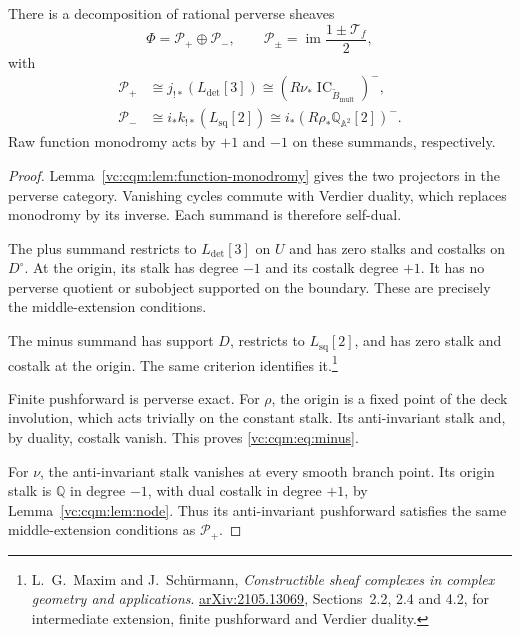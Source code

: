 \begin{theorem}\label{vc:cqm:thm:coefficient}
There is a decomposition of rational perverse sheaves
\begin{equation}\label{vc:cqm:eq:decomposition}
 \Phi=\mathcal P_+\oplus\mathcal P_-,
 \qquad \mathcal P_\pm=\operatorname{im}
                  \frac{1\pm\mathcal T_f}{2},
\end{equation}
with
\begin{align}
 \mathcal P_+&\cong j_{!*}(L_{\det}[3])
       \cong(R\nu_*\operatorname{IC}_{\widetilde B_{\mathrm{mult}}})^- ,
       \label{vc:cqm:eq:plus}\\
 \mathcal P_-&\cong i_*k_{!*}(L_{\mathrm{sq}}[2])
       \cong i_*(R\rho_*\mathbb Q_{\mathbb A^2}[2])^- .
       \label{vc:cqm:eq:minus}
\end{align}
Raw function monodromy acts by $+1$ and $-1$ on these
summands, respectively.
\end{theorem}

\begin{proof}
Lemma~\ref{vc:cqm:lem:function-monodromy} gives the two
projectors in the perverse category. Vanishing cycles
commute with Verdier duality, which replaces monodromy
by its inverse. Each summand is therefore self-dual.

The plus summand restricts to $L_{\det}[3]$ on $U$ and
has zero stalks and costalks on $D^\circ$. At the origin,
its stalk has degree $-1$ and its costalk degree $+1$.
It has no perverse quotient or subobject supported on the
boundary. These are precisely the middle-extension
conditions.

The minus summand has support $D$, restricts
to $L_{\mathrm{sq}}[2]$, and has zero stalk and costalk
at the origin. The same criterion identifies it.\footnote{
L.~G.~Maxim and J.~Sch\"urmann, \emph{Constructible sheaf
complexes in complex geometry and applications}.
\href{https://arxiv.org/abs/2105.13069}{arXiv:2105.13069},
Sections~2.2, 2.4 and 4.2, for intermediate extension,
finite pushforward and Verdier duality.}

Finite pushforward is perverse exact. For $\rho$, the
origin is a fixed point of the deck involution, which
acts trivially on the constant stalk. Its anti-invariant
stalk and, by duality, costalk vanish. This proves
\eqref{vc:cqm:eq:minus}.

For $\nu$, the anti-invariant stalk
vanishes at every smooth branch point. Its origin stalk
is $\mathbb Q$ in degree $-1$, with dual costalk in degree
$+1$, by Lemma~\ref{vc:cqm:lem:node}. Thus its
anti-invariant pushforward satisfies the same
middle-extension conditions as $\mathcal P_+$.
\end{proof}

